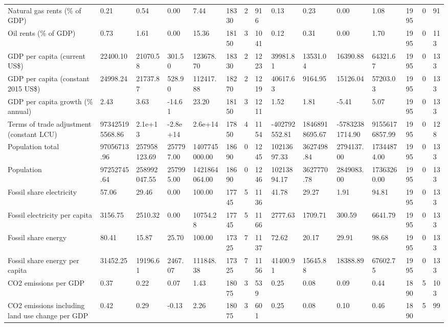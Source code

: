 \begin{longtable}{lllllllllllllll}
Natural gas rents (\% of GDP) & 0.21 & 0.54 & 0.00 & 7.44 & 18330 & 2 & 916 & 0.13 & 0.23 & 0.00 & 1.08 & 1995 & 0 & 91\\
Oil rents (\% of GDP) & 0.73 & 1.61 & 0.00 & 15.36 & 18150 & 3 & 1041 & 0.12 & 0.31 & 0.00 & 1.70 & 1995 & 0 & 113\\
GDP per capita (current US\$) & 22400.10 & 21070.58 & 301.50 & 123678.70 & 18330 & 2 & 1223 & 39981.81 & 13531.04 & 16390.88 & 64321.67 & 1995 & 0 & 133\\
GDP per capita (constant 2015 US\$) & 24998.24 & 21737.87 & 528.90 & 112417.88 & 18270 & 2 & 1219 & 40617.63 & 9164.95 & 15126.04 & 57203.03 & 1995 & 0 & 133\\
\addlinespace
GDP per capita growth (\% annual) & 2.43 & 3.63 & -14.61 & 23.20 & 18150 & 3 & 1211 & 1.52 & 1.81 & -5.41 & 5.07 & 1995 & 0 & 133\\
Terms of trade adjustment (constant LCU) & 973425195568.86 & 2.1e+13 & -2.8e+14 & 2.6e+14 & 17850 & 4 & 1154 & -402792552.81 & 18468918695.67 & -57832381714.90 & 91556176857.99 & 1995 & 0 & 128\\
Population total & 97056713.96 & 257958123.69 & 257797.00 & 1407745000.00 & 18690 & 0 & 1245 & 10213697.33 & 3627498.84 & 2794137.00 & 17344874.00 & 1995 & 0 & 133\\
Population & 97252745.64 & 258992047.55 & 257995.00 & 1421864064.00 & 18690 & 0 & 1246 & 10213894.17 & 3627770.78 & 2849083.00 & 17363260.00 & 1995 & 0 & 133\\
Fossil share electricity & 57.06 & 29.46 & 0.00 & 100.00 & 17745 & 5 & 1136 & 41.78 & 29.27 & 1.91 & 94.81 & 1995 & 0 & 133\\
\addlinespace
Fossil electricity per capita & 3156.75 & 2510.32 & 0.00 & 10754.28 & 17745 & 5 & 1166 & 2777.63 & 1709.71 & 300.59 & 6641.79 & 1995 & 0 & 133\\
Fossil share energy & 80.41 & 15.87 & 25.70 & 100.00 & 17325 & 7 & 1137 & 72.62 & 20.17 & 29.91 & 98.68 & 1995 & 0 & 133\\
Fossil share energy per capita & 31452.25 & 19196.61 & 2467.07 & 111848.38 & 17325 & 7 & 1156 & 41400.91 & 15645.88 & 18388.89 & 67602.75 & 1995 & 0 & 133\\
CO2 emissions per GDP & 0.37 & 0.22 & 0.07 & 1.43 & 18075 & 3 & 539 & 0.25 & 0.08 & 0.09 & 0.44 & 1890 & 5 & 103\\
CO2 emissions including land use change per GDP & 0.42 & 0.29 & -0.13 & 2.26 & 18075 & 3 & 601 & 0.25 & 0.08 & 0.10 & 0.46 & 1890 & 5 & 99\\

\end{longtable}
